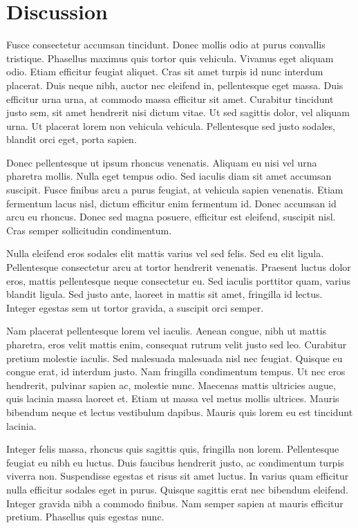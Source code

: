 \documentclass{article}
\begin{document}
\hypertarget{discussion}{%
\section{Discussion}\label{discussion}}

Fusce consectetur accumsan tincidunt. Donec mollis odio at purus
convallis tristique. Phasellus maximus quis tortor quis vehicula.
Vivamus eget aliquam odio. Etiam efficitur feugiat aliquet. Cras sit
amet turpis id nunc interdum placerat. Duis neque nibh, auctor nec
eleifend in, pellentesque eget massa. Duis efficitur urna urna, at
commodo massa efficitur sit amet. Curabitur tincidunt justo sem, sit
amet hendrerit nisi dictum vitae. Ut sed sagittis dolor, vel aliquam
urna. Ut placerat lorem non vehicula vehicula. Pellentesque sed justo
sodales, blandit orci eget, porta sapien.

Donec pellentesque ut ipsum rhoncus venenatis. Aliquam eu nisi vel urna
pharetra mollis. Nulla eget tempus odio. Sed iaculis diam sit amet
accumsan suscipit. Fusce finibus arcu a purus feugiat, at vehicula
sapien venenatis. Etiam fermentum lacus nisl, dictum efficitur enim
fermentum id. Donec accumsan id arcu eu rhoncus. Donec sed magna
posuere, efficitur est eleifend, suscipit nisl. Cras semper sollicitudin
condimentum.

Nulla eleifend eros sodales elit mattis varius vel sed felis. Sed eu
elit ligula. Pellentesque consectetur arcu at tortor hendrerit
venenatis. Praesent luctus dolor eros, mattis pellentesque neque
consectetur eu. Sed iaculis porttitor quam, varius blandit ligula. Sed
justo ante, laoreet in mattis sit amet, fringilla id lectus. Integer
egestas sem ut tortor gravida, a suscipit orci semper.

Nam placerat pellentesque lorem vel iaculis. Aenean congue, nibh ut
mattis pharetra, eros velit mattis enim, consequat rutrum velit justo
sed leo. Curabitur pretium molestie iaculis. Sed malesuada malesuada
nisl nec feugiat. Quisque eu congue erat, id interdum justo. Nam
fringilla condimentum tempus. Ut nec eros hendrerit, pulvinar sapien ac,
molestie nunc. Maecenas mattis ultricies augue, quis lacinia massa
laoreet et. Etiam ut massa vel metus mollis ultrices. Mauris bibendum
neque et lectus vestibulum dapibus. Mauris quis lorem eu est tincidunt
lacinia.

Integer felis massa, rhoncus quis sagittis quis, fringilla non lorem.
Pellentesque feugiat eu nibh eu luctus. Duis faucibus hendrerit justo,
ac condimentum turpis viverra non. Suspendisse egestas et risus sit amet
luctus. In varius quam efficitur nulla efficitur sodales eget in purus.
Quisque sagittis erat nec bibendum eleifend. Integer gravida nibh a
commodo finibus. Nam semper sapien at mauris efficitur pretium.
Phasellus quis egestas nunc.


\end{document}
